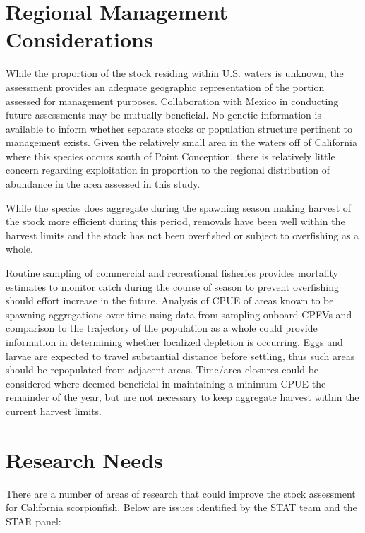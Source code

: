 \documentclass[12pt,]{article}
\begin{document}
\section{Regional Management
Considerations}\label{regional-management-considerations}

While the proportion of the stock residing within U.S. waters is
unknown, the assessment provides an adequate geographic representation
of the portion assessed for management purposes. Collaboration with
Mexico in conducting future assessments may be mutually beneficial. No
genetic information is available to inform whether separate stocks or
population structure pertinent to management exists. Given the
relatively small area in the waters off of California where this species
occurs south of Point Conception, there is relatively little concern
regarding exploitation in proportion to the regional distribution of
abundance in the area assessed in this study.

While the species does aggregate during the spawning season making
harvest of the stock more efficient during this period, removals have
been well within the harvest limits and the stock has not been
overfished or subject to overfishing as a whole.

Routine sampling of commercial and recreational fisheries provides
mortality estimates to monitor catch during the course of season to
prevent overfishing should effort increase in the future. Analysis of
CPUE of areas known to be spawning aggregations over time using data
from sampling onboard CPFVs and comparison to the trajectory of the
population as a whole could provide information in determining whether
localized depletion is occurring. Eggs and larvae are expected to travel
substantial distance before settling, thus such areas should be
repopulated from adjacent areas. Time/area closures could be considered
where deemed beneficial in maintaining a minimum CPUE the remainder of
the year, but are not necessary to keep aggregate harvest within the
current harvest limits.

\section{Research Needs}\label{research-needs}

There are a number of areas of research that could improve the stock
assessment for California scorpionfish. Below are issues identified by
the STAT team and the STAR panel:
\end{document}
